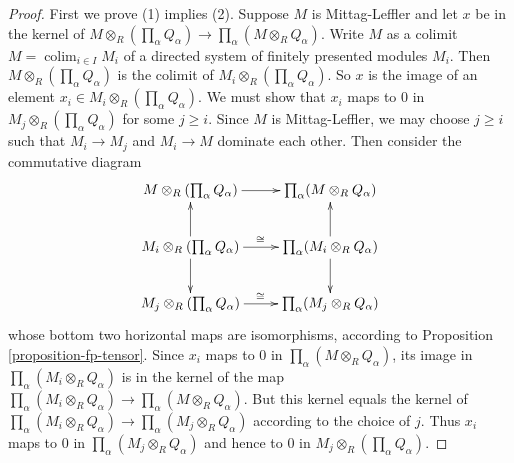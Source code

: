 \documentclass{amsart}
\theoremstyle{plain}
\theoremstyle{definition}
\theoremstyle{remark}
\numberwithin{equation}{subsection}
\def\colim{\mathop{\mathrm{colim}}\nolimits}
\begin{document}
\begin{proof}
First we prove (1) implies (2).  Suppose $M$ is Mittag-Leffler and let $x$ be
in the kernel of $M \otimes_R (\prod_{\alpha} Q_{\alpha}) \to
\prod_{\alpha} (M \otimes_R Q_{\alpha})$.  Write $M$ as a colimit $M =
\colim_{i \in I} M_i$ of a directed system of finitely presented modules
$M_i$.
 Then $M \otimes_R (\prod_{\alpha} Q_{\alpha})$ is the colimit of $M_i
\otimes_R (\prod_{\alpha} Q_{\alpha})$.  So $x$ is the image of an element
$x_i \in M_i \otimes_R (\prod_{\alpha} Q_{\alpha})$.  We must show that $x_i$
maps to $0$ in $M_j \otimes_R (\prod_{\alpha} Q_{\alpha})$ for some $j \geq
i$.  Since $M$ is Mittag-Leffler, we may choose $j \geq i$ such that $M_i
\to M_j$ and $M_i \to M$ dominate each other.  Then consider
the commutative diagram
$$
\xymatrix{
M \otimes_R (\prod_{\alpha} Q_{\alpha}) \ar[r] & \prod_{\alpha} (M
\otimes_R Q_{\alpha}) \\
M_i \otimes_R (\prod_{\alpha} Q_{\alpha}) \ar[r]^{\cong} \ar[d] \ar[u] &
\prod_{\alpha} (M_i \otimes_R Q_{\alpha}) \ar[d] \ar[u] \\
M_j \otimes_R (\prod_{\alpha} Q_{\alpha}) \ar[r]^{\cong} & \prod_{\alpha}
(M_j \otimes_R Q_{\alpha})
}
$$
whose bottom two horizontal maps are isomorphisms, according to Proposition
\ref{proposition-fp-tensor}.  Since $x_i$ maps to $0$ in $\prod_{\alpha} (M
\otimes_R Q_{\alpha})$, its image in $\prod_{\alpha} (M_i \otimes_R
Q_{\alpha})$ is in the kernel of the map $\prod_{\alpha} (M_i \otimes_R
Q_{\alpha}) \to \prod_{\alpha} (M \otimes_R Q_{\alpha})$.  But this
kernel equals the kernel of $\prod_{\alpha} (M_i \otimes_R Q_{\alpha})
\to \prod_{\alpha} (M_j \otimes_R Q_{\alpha})$ according to the
choice of $j$.  Thus $x_i$ maps to $0$ in $\prod_{\alpha} (M_j \otimes_R
Q_{\alpha})$ and hence to $0$ in $M_j \otimes_R (\prod_{\alpha} Q_{\alpha})$.


\end{proof}
\end{document}
